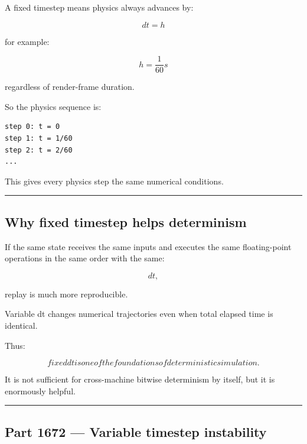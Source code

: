 \hypertarget{06-engine-ii-ch037-part-1671-fixed-timestep}{}

A fixed timestep means physics always advances by:

\[
\boxed{
dt=h
}
\]

for example:

\[
h=\frac1{60}s
\]

regardless of render-frame duration.

So the physics sequence is:

\begin{verbatim}
step 0: t = 0
step 1: t = 1/60
step 2: t = 2/60
...
\end{verbatim}

This gives every physics step the same numerical conditions.

\begin{center}\rule{0.5\linewidth}{0.5pt}\end{center}

\subsection{Why fixed timestep helps determinism}\label{06-engine-ii-ch037-why-fixed-timestep-helps-determinism}

\hypertarget{06-engine-ii-ch037-why-fixed-timestep-helps-determinism}{}

If the same state receives the same inputs and executes the same floating-point operations in the same order with the same:

\[
dt,
\]

replay is much more reproducible.

Variable dt changes numerical trajectories even when total elapsed time is identical.

Thus:

\[
\boxed{
fixed dt is one of the foundations of deterministic simulation.
}
\]

It is not sufficient for cross-machine bitwise determinism by itself, but it is enormously helpful.

\begin{center}\rule{0.5\linewidth}{0.5pt}\end{center}

\subsection{Part 1672 --- Variable timestep instability}\label{06-engine-ii-ch037-part-1672-variable-timestep-instability}

